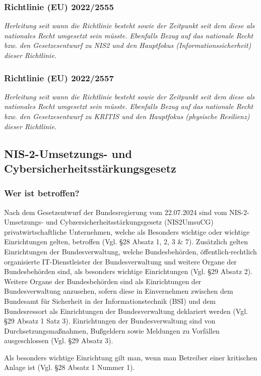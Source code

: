 \documentclass[11pt,a4paper]{article}   %
\begin{document}
            \subsubsection{Richtlinie (EU) 2022/2555}
                \emph{Herleitung seit wann die Richtlinie besteht sowie der Zeitpunkt seit dem diese als nationales Recht umgesetzt sein müsste. Ebenfalls Bezug auf das nationale Recht bzw. den Gesetzesentwurf zu NIS2 und den Hauptfokus (Informationssicherheit) dieser Richtlinie.}
            \subsubsection{Richtlinie (EU) 2022/2557}
            \emph{Herleitung seit wann die Richtlinie besteht sowie der Zeitpunkt seit dem diese als nationales Recht umgesetzt sein müsste. Ebenfalls Bezug auf das nationale Recht bzw. den Gesetzesentwurf zu KRITIS und den Hauptfokus (physische Resilienz) dieser Richtlinie.}
        
        \subsection{NIS-2-Umsetzungs- und Cybersicherheitsstärkungsgesetz}
        \subsubsection{Wer ist betroffen?}
        Nach dem Gesetzentwurf der Bundesregierung vom 22.07.2024 sind vom NIS-2-Umsetzungs- und Cybzersicherheitsstärkungsgesetz (NIS2UmsuCG) privatwirtschaftliche Unternehmen, welche als Besonders wichtige oder wichtige Einrichtungen gelten, betroffen (Vgl. §28 Absatz 1, 2, 3 \& 7). Zusätzlich gelten Einrichtungen der Bundesverwaltung, welche Bundesbehörden, öffentlich-rechtlich organisierte IT-Dienstleister der Bundesverwaltung und weitere Organe der Bundesbehörden sind, als besonders wichtige Einrichtungen (Vgl. §29 Absatz 2). Weitere Organe der Bundesbehörden sind als Einrichtungen der Bundesverwaltung anzusehen, sofern diese in Einvernehmen zwischen dem Bundesamt für Sicherheit in der Informationstechnik (BSI) und dem Bundesressort als Einrichtungen der Bundesverwaltung deklariert werden (Vgl. §29 Absatz 1 Satz 3). Einrichtungen der Bundesverwaltung sind von Durchsetzungsmaßnahmen, Bußgeldern sowie Meldungen zu Vorfällen ausgeschlossen (Vgl. §29 Absatz 3).

        Als besonders wichtige Einrichtung gilt man, wenn man Betreiber einer kritischen Anlage ist (Vgl. §28 Absatz 1 Nummer 1). 
\end{document}
